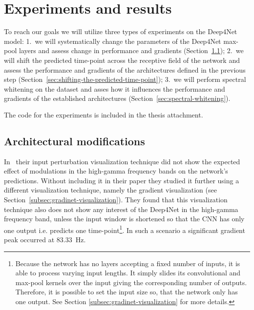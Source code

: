 \chapter{Experiments and results}
\label{ch:exp}

To reach our goals we will utilize three types of experiments on the Deep4Net model:
1.~we will systematically change the parameters of the Deep4Net max-pool layers and assess change in performance and gradients (Section~\ref{sec:architectural-modifications}); 2.~we will shift the predicted time-point across the receptive field of the network and assess the performance and gradients of the architectures defined in the previous step (Section~\ref{sec:shifting-the-predicted-time-point}); 3.~we will perform spectral whitening on the dataset and asses how it influences the performance and gradients of the established architectures (Section~\ref{sec:spectral-whitening}). 

The code for the experiments is included in the thesis attachment. 

\section{Architectural modifications}\label{sec:architectural-modifications}
In~\cite{Hammer-2021} their input perturbation visualization technique did not show the expected effect of modulations in the high-gamma frequency bands on the network's predictions.
Without including it in their paper they studied it further using a different visualization technique, namely the gradient visualization (see Section~\ref{subsec:gradinet-visualization}). 
They found that this visualization technique also does not show any interest of the Deep4Net in the high-gamma frequency band, unless the input window is shortened so that the CNN has only one output i.e. predicts one time-point\footnote{Because the network has no layers accepting a fixed number of inputs, it is able to process varying input lengths. It simply slides its convolutional and max-pool kernels over the input giving the corresponding number of outputs. Therefore, it is possible to set the input size so, that the network only has one output. See Section \ref{subsec:gradinet-visualization} for more details.}.
In such a scenario a significant gradient peak occurred at 83.33~Hz.


